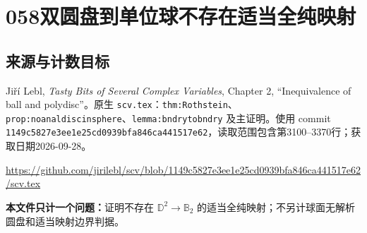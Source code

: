 \documentclass[UTF8,11pt]{ctexart}
\theoremstyle{definition}
\newcommand{\D}{\mathbb D}
\newcommand{\bB}{\mathbb B}
\begin{document}
\section*{058\quad 双圆盘到单位球不存在适当全纯映射}
\subsection*{来源与计数目标}
Ji\v{r}\'i Lebl, \emph{Tasty Bits of Several Complex Variables}, Chapter 2, ``Inequivalence of ball and polydisc''。原生 \texttt{scv.tex}：\texttt{thm:Rothstein}、\texttt{prop:noanaldiscinsphere}、\texttt{lemma:bndrytobndry} 及主证明。使用 commit \texttt{1149c5827e3ee1e25cd0939bfa846ca441517e62}，读取范围包含第3100--3370行；获取日期2026-09-28。
\par\url{https://github.com/jirilebl/scv/blob/1149c5827e3ee1e25cd0939bfa846ca441517e62/scv.tex}
\par\textbf{本文件只计一个问题：}证明不存在 $\D^2\to\bB_2$ 的适当全纯映射；不另计球面无解析圆盘和适当映射边界判据。
\end{document}
